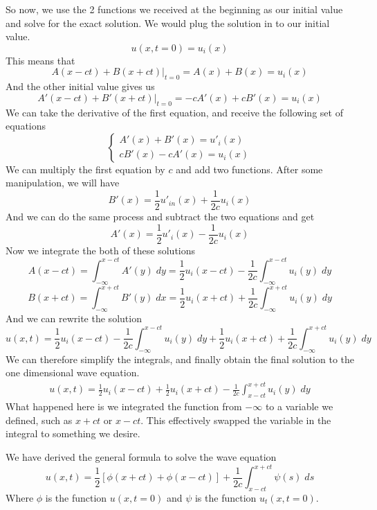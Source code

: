 \documentclass[12pt]{book}
\newcommand{\sqbkt}[1]{\left[ #1 \right]}
\begin{document}
So now, we use the 2 functions we received at the beginning as our initial value and solve for the exact solution.  We would plug the solution in to our initial value.
\[
u(x,t=0)=u_{i}(x)
\]
This means that
\[
\left. A(x-ct)+B(x+ct)\right|_{t=0} = A(x)+B(x) = u_{i}(x)
\]
And the other initial value gives us
\[
\left. A'(x-ct)+B'(x+ct)\right|_{t=0} =-cA'(x)+cB'(x) = u_{i}(x)
\]
We can take the derivative of the first equation, and receive the following set of equations
\[
\begin{cases}
    A'(x)+B'(x)=u'_{i}(x)\\
    cB'(x)-cA'(x)=u_{i}(x)
\end{cases}
\]
We can multiply the first equation by $c$ and add two functions. After some manipulation, we will have
\[
B'(x) = \frac{1}{2} u'_{in}(x) + \frac{1}{2c}u_{i}(x)
\]
And we can do the same process and subtract the two equations and get
\[
A'(x) = \frac{1}{2} u'_{i}(x) - \frac{1}{2c}u_{i}(x)
\]
Now we integrate the both of these solutions
\[
A(x-ct)=\int_{-\infty}^{x-ct} A'(y) \; dy = \frac{1}{2}u_{i}(x-ct)-\frac{1}{2c}\int_{-\infty}^{x-ct}u_{i}(y)\;dy
\]
\[
B(x+ct)=\int_{-\infty}^{x+ct} B'(y) \; dx = \frac{1}{2}u_{i}(x+ct)+\frac{1}{2c}\int_{-\infty}^{x+ct}u_{i}(y)\;dy
\]
And we can rewrite the solution
\[
u(x,t) = \frac{1}{2}u_{i}(x-ct)-\frac{1}{2c}\int_{-\infty}^{x-ct}u_{i}(y)\;dy + \frac{1}{2}u_{i}(x+ct)+\frac{1}{2c}\int_{-\infty}^{x+ct}u_{i}(y)\;dy 
\]
We can therefore simplify the integrals, and finally obtain the final solution to the one dimensional wave equation.
\begin{align}
u(x,t) = \frac{1}{2}u_{i}(x-ct)+ \frac{1}{2}u_{i}(x+ct)-\frac{1}{2c}\int_{x-ct}^{x+ct}u_{i}(y)\;dy 
\end{align}
What happened here is we integrated the function from $-\infty$ to a variable we defined, such as $x+ct$ or $x-ct$. This effectively swapped the variable in the integral to something we desire.

We have derived the general formula to solve the wave equation
\[
u(x,t) = \frac{1}{2}\sqbkt{\phi(x+ct)+\phi(x-ct)}+\frac{1}{2c}\int_{x-ct}^{x+ct} \psi(s) \;ds
\]
Where $\phi$ is the function $u(x,t=0)$ and $\psi$ is the function $u_t(x,t=0)$.
\end{document}
